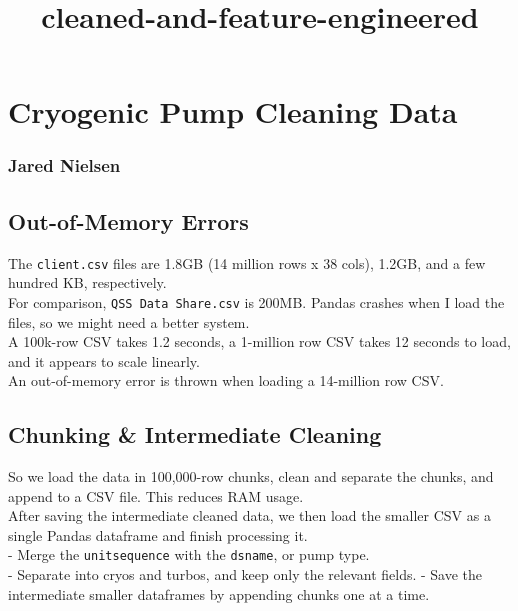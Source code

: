 \documentclass[11pt]{article}
\title{cleaned-and-feature-engineered}
\begin{document}
    
    
    \maketitle
    
    

    
    \section{Cryogenic Pump Cleaning
Data}\label{cryogenic-pump-cleaning-data}

\subsubsection{Jared Nielsen}\label{jared-nielsen}

\subsection{Out-of-Memory Errors}\label{out-of-memory-errors}

The \texttt{client.csv} files are 1.8GB (14 million rows x 38 cols),
1.2GB, and a few hundred KB, respectively.\\
For comparison, \texttt{QSS\ Data\ Share.csv} is 200MB. Pandas crashes
when I load the files, so we might need a better system.\\
A 100k-row CSV takes 1.2 seconds, a 1-million row CSV takes 12 seconds
to load, and it appears to scale linearly.\\
An out-of-memory error is thrown when loading a 14-million row CSV.

\subsection{Chunking \& Intermediate
Cleaning}\label{chunking-intermediate-cleaning}

So we load the data in 100,000-row chunks, clean and separate the
chunks, and append to a CSV file. This reduces RAM usage.\\
After saving the intermediate cleaned data, we then load the smaller CSV
as a single Pandas dataframe and finish processing it.\\
- Merge the \texttt{unitsequence} with the \texttt{dsname}, or pump
type.\\
- Separate into cryos and turbos, and keep only the relevant fields. -
Save the intermediate smaller dataframes by appending chunks one at a
time.
\end{document}
